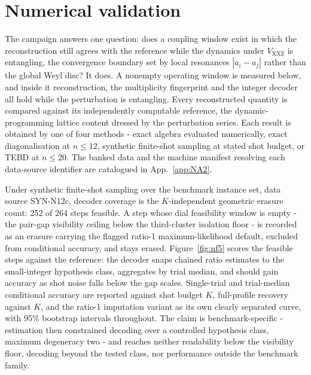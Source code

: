 \section{Numerical validation}\label{sec:N6}

The campaign answers one question: does a coupling window exist in which the reconstruction still agrees with the reference while the dynamics under $V_{\mathrm{XXZ}}$ is entangling, the convergence boundary set by local resonances $|a_i - a_j|$ rather than the global Weyl disc? It does. A nonempty operating window is measured below, and inside it reconstruction, the multiplicity fingerprint and the integer decoder all hold while the perturbation is entangling. Every reconstructed quantity is compared against its independently computable reference, the dynamic-programming lattice content dressed by the perturbation series. Each result is obtained by one of four methods - exact algebra evaluated numerically, exact diagonalisation at $n \le 12$, synthetic finite-shot sampling at stated shot budget, or TEBD at $n \le 20$. The banked data and the machine manifest resolving each data-source identifier are catalogued in App.~\ref{app:NA2}.

Under synthetic finite-shot sampling over the benchmark instance set, data source SYN-N12c, decoder coverage is the $K$-independent geometric erasure count: 252 of 264 steps feasible. A step whose dial feasibility window is empty - the pair-gap visibility ceiling below the third-cluster isolation floor - is recorded as an erasure carrying the flagged ratio-1 maximum-likelihood default, excluded from conditional accuracy, and stays erased. Figure~\ref{fig:nf5} scores the feasible steps against the reference: the decoder snaps chained ratio estimates to the small-integer hypothesis class, aggregates by trial median, and should gain accuracy as shot noise falls below the gap scales. Single-trial and trial-median conditional accuracy are reported against shot budget $K$, full-profile recovery against $K$, and the ratio-1 imputation variant as its own clearly separated curve, with 95\% bootstrap intervals throughout. The claim is benchmark-specific - estimation then constrained decoding over a controlled hypothesis class, maximum degeneracy two - and reaches neither readability below the visibility floor, decoding beyond the tested class, nor performance outside the benchmark family.

